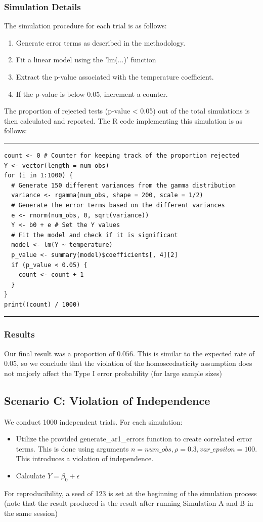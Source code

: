 \documentclass{article}
\begin{document}
\subsubsection*{Simulation Details}
The simulation procedure for each trial is as follows:
\begin{enumerate}
    \item Generate error terms as described in the methodology.
    \item Fit a linear model using the 'lm(...)' function
    \item Extract the p-value associated with the temperature coefficient.
    \item If the p-value is below 0.05, increment a counter.
\end{enumerate}
The proportion of rejected tests (p-value < 0.05) out of the total simulations is then calculated and reported.  The R code implementing this simulation is as follows:
\par\noindent\rule{\textwidth}{0.4pt}
\vspace{-25pt} %
\begin{verbatim}
count <- 0 # Counter for keeping track of the proportion rejected
Y <- vector(length = num_obs)
for (i in 1:1000) {
  # Generate 150 different variances from the gamma distribution
  variance <- rgamma(num_obs, shape = 200, scale = 1/2)
  # Generate the error terms based on the different variances
  e <- rnorm(num_obs, 0, sqrt(variance))
  Y <- b0 + e # Set the Y values
  # Fit the model and check if it is significant
  model <- lm(Y ~ temperature)
  p_value <- summary(model)$coefficients[, 4][2]
  if (p_value < 0.05) {
    count <- count + 1
  }
}
print((count) / 1000)
\end{verbatim}
\vspace{-15pt} %
\par\noindent\rule{\textwidth}{0.4pt}
\subsubsection*{Results}
Our final result was a proportion of $0.056$. This is similar to the expected rate of $0.05$, so we conclude that the violation of the homoscedasticity assumption does not majorly affect the Type I error probability (for large sample sizes)
\subsection{Scenario C: Violation of Independence}
We conduct 1000 independent trials. For each simulation:
\begin{itemize}
    \item Utilize the provided generate\_ar1\_errors function to create correlated error terms. This is done using arguments $n = num\_obs, \rho = 0.3, var\_epsilon = 100$. This introduces a violation of independence.
    \item Calculate $Y = \beta_0 + \epsilon$
\end{itemize}
For reproducibility, a seed of 123 is set at the beginning of the simulation process (note that the result produced is the result after running Simulation A and B in the same session)
\end{document}
